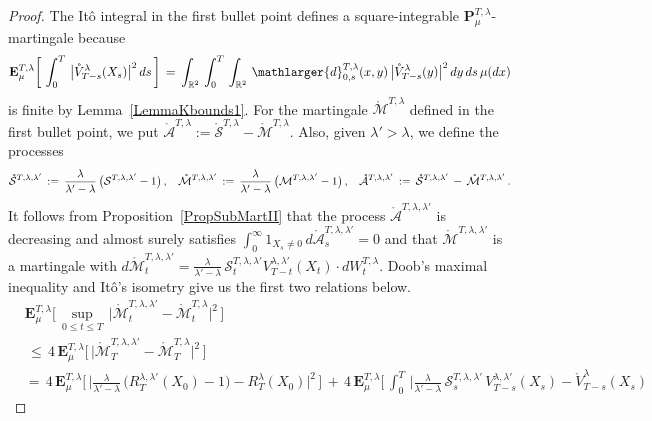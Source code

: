 \documentclass[10pt]{article}
\numberwithin{equation}{section}
\theoremstyle{definition}
\newcommand{\R}{{\mathbb R}}
\begin{document}
\begin{proof}  The It\^o integral in the first bullet point defines a square-integrable $\mathbf{P}^{T,\lambda}_{\mu}$-martingale because 
$$ \mathbf{E}^{T,\lambda}_{\mu}\bigg[ \,\int_0^T \,\big|\mathring{V}_{T-s }^{\lambda}(X_s)\big|^2\,ds\,\bigg]\,=\,\int_{\R^2} \, \int_0^T \,\int_{\R^2} \, \mathlarger{d}^{T,\lambda}_{0,s}(x,y)\,\big|\mathring{V}_{T-s }^{\lambda}(y)\big|^2\,dy   \,ds \,  \mu(dx) $$
is finite by Lemma~\ref{LemmaKbounds1}.  For the martingale $\mathring{\mathcal{M}}^{T,\lambda}$ defined in the first bullet point,  we put $\mathring{\mathcal{A}}^{T,\lambda}:=\mathring{\mathcal{S}}^{T,\lambda}-\mathring{\mathcal{M}}^{T,\lambda}$. Also, given $\lambda'>\lambda$, we define the processes 
$$ \mathring{\mathcal{S}}^{T,\lambda,\lambda'}\,:=\, \frac{\lambda}{\lambda'-\lambda}\, \big(\mathcal{S}^{T,\lambda,\lambda' }-1\big)\,, \hspace{.3cm}   \mathring{\mathcal{M}}^{T,\lambda, \lambda'}\,:=\, \frac{\lambda}{\lambda'-\lambda}\, \big(\mathcal{M}^{T,\lambda,\lambda'}-1\big)\,,  \hspace{.3cm}  \mathring{\mathcal{A}}^{T,\lambda,\lambda'} \,:=\,\mathring{\mathcal{S}}^{T,\lambda,\lambda'}\,-\, \mathring{\mathcal{M}}^{T,\lambda,\lambda'}  \,.$$
It follows from Proposition~\ref{PropSubMartII} that  the process $ \mathring{\mathcal{A}}^{T,\lambda,\lambda'}  $  is decreasing  and almost surely satisfies $\int_0^{\infty}1_{X_s\neq 0 }\, d\mathring{\mathcal{A}}^{T,\lambda,\lambda'}_s=0 $ and that $\mathring{\mathcal{M}}^{T,\lambda, \lambda'}$ is a martingale with  $d\mathring{\mathcal{M}}^{T,\lambda, \lambda'}_t=\frac{\lambda}{\lambda'-\lambda} \,\mathcal{S}_t^{T,\lambda,\lambda' } V_{T-t }^{\lambda,\lambda'}(X_t) \cdot dW_{t}^{T,\lambda} $.  Doob's maximal inequality and It\^o's isometry give us the first two relations below.
\begin{align*}
&\mathbf{E}^{T,\lambda}_{\mu}\bigg[\, \sup_{0\leq t\leq T} \,\Big|\mathring{\mathcal{M}}^{T,\lambda,\lambda'}_t -\mathring{\mathcal{M}}^{T,\lambda}_t \Big|^2 \, \bigg]\\ &\,\leq \,   4\,  \mathbf{E}^{T,\lambda}_{\mu}\bigg[\,  \Big|\mathring{\mathcal{M}}^{T,\lambda,\lambda'}_T -\mathring{\mathcal{M}}^{T,\lambda}_T 
 \Big|^2\,\bigg]\\
 &=\,  4\, \mathbf{E}^{T,\lambda}_{\mu}\Bigg[\, \bigg| \frac{\lambda}{\lambda'-\lambda}\, \Big(R_{T }^{\lambda,\lambda'}(X_0) -1\Big)   - R_{T }^{\lambda}(X_0) 
 \bigg|^2   \,\Bigg]        \,+\,  4\, \mathbf{E}^{T,\lambda}_{\mu}\Bigg[\, \int_0^T\, \bigg| \frac{\lambda}{\lambda'-\lambda} \,\mathcal{S}_s^{T,\lambda,\lambda' }\, V_{T-s }^{\lambda,\lambda'}(X_s)    - \mathring{V}_{T-s }^{\lambda}(X_s) 

\end{align*}
\end{proof}
\end{document}
